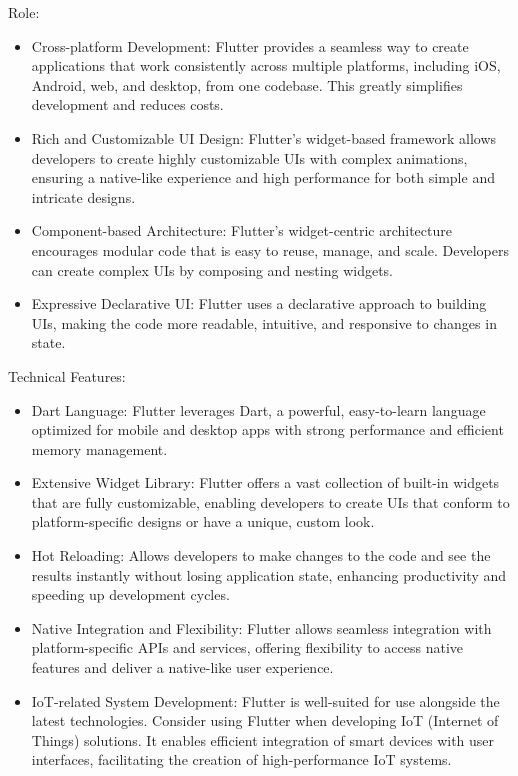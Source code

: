 \documentclass[conference]{IEEEtran}
\begin{document}
Role:
\begin{itemize}
    \item Cross-platform Development: Flutter provides a seamless way to create applications that work consistently across multiple platforms, including iOS, Android, web, and desktop, from one codebase. This greatly simplifies development and reduces costs.\\
    \item Rich and Customizable UI Design: Flutter's widget-based framework allows developers to create highly customizable UIs with complex animations, ensuring a native-like experience and high performance for both simple and intricate designs.\\
    \item Component-based Architecture: Flutter's widget-centric architecture encourages modular code that is easy to reuse, manage, and scale. Developers can create complex UIs by composing and nesting widgets.\\
    \item Expressive Declarative UI: Flutter uses a declarative approach to building UIs, making the code more readable, intuitive, and responsive to changes in state.\\
\end{itemize}

Technical Features:
\begin{itemize}
    \item Dart Language: Flutter leverages Dart, a powerful, easy-to-learn language optimized for mobile and desktop apps with strong performance and efficient memory management.\\
    \item Extensive Widget Library: Flutter offers a vast collection of built-in widgets that are fully customizable, enabling developers to create UIs that conform to platform-specific designs or have a unique, custom look.
    \item Hot Reloading: Allows developers to make changes to the code and see the results instantly without losing application state, enhancing productivity and speeding up development cycles.\\
    \item Native Integration and Flexibility: Flutter allows seamless integration with platform-specific APIs and services, offering flexibility to access native features and deliver a native-like user experience.\\
    \item IoT-related System Development: Flutter is well-suited for use alongside the latest technologies. Consider using Flutter when developing IoT (Internet of Things) solutions. It enables efficient integration of smart devices with user interfaces, facilitating the creation of high-performance IoT systems.
\end{itemize}
\end{document}
